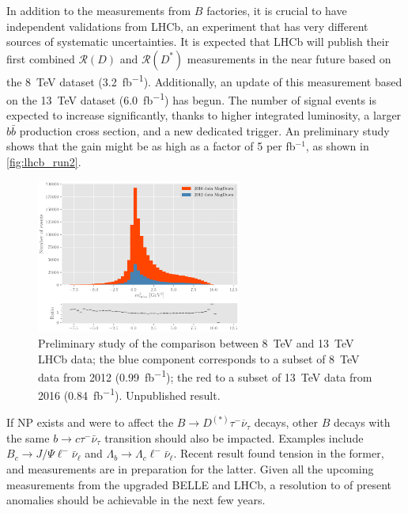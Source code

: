 \documentclass[12pt,letterpaper]{article}
\newcommand{\PRLrule}{
    \bigskip
    \noindent\makebox[\linewidth]{
        \resizebox{0.3333\linewidth}{1pt}{$\blacklozenge$}
    }
    \bigskip
}
\def\RD/{\ensuremath{\mathcal{R}(D)}}
\def\RDst/{\ensuremath{\mathcal{R}(D^{*})}}
\def\DDst/{\ensuremath{D^{(*)}}}
\newcommand{\BMesonMode}[2]{\ensuremath{
    B \rightarrow #2 #1^- \overline{\nu}_#1
}}
\newcommand{\BDDstMode}[1]{\BMesonMode{#1}{\DDst/}}
\begin{document}
In addition to the measurements from $B$ factories, it is crucial to have
independent validations from LHCb, an experiment that has very different sources
of systematic uncertainties.
It is expected that LHCb will publish their first combined \RD/ and \RDst/
measurements in the near future based on the \SI{8}{TeV} dataset
(\SI{3.2}{fb^{-1}}).
Additionally, an update of this measurement based on the \SI{13}{TeV} dataset
(\SI{6.0}{fb^{-1}}) has begun.
The number of signal events is expected to increase significantly, thanks to
higher integrated luminosity, a larger $b \bar{b}$ production cross section, and
a new dedicated trigger.
An preliminary study shows that the gain might be as high as a factor of 5 per
fb$^{-1}$, as shown in \autoref{fig:lhcb_run2}.

\begin{figure}[ht]
    \centering
    \includegraphics[width=0.6\textwidth]{figs/lhcb_run2.pdf}
    \caption{
        Preliminary study of the comparison between \SI{8}{TeV} and \SI{13}{TeV}
        LHCb data;
        the blue component corresponds to a subset of \SI{8}{TeV} data from 2012
        (\SI{0.99}{fb^{-1}});
        the red to a subset of \SI{13}{TeV} data from 2016 (\SI{0.84}{fb^{-1}}).
        Unpublished result.
    }
    \label{fig:lhcb_run2}
\end{figure}

If NP exists and were to affect the \BDDstMode{\tau} decays, other $B$ decays
with the same $b \rightarrow c \tau^- \bar{\nu}_\tau$ transition should also be
impacted.
Examples include $B_c \rightarrow J/\Psi \ell^- \bar{\nu}_\ell$ and
$\Lambda_b \rightarrow \Lambda_c \ell^- \bar{\nu}_\ell$.
Recent result \cite{Aaij:2017tyk} found tension in the former, and measurements
are in preparation for the latter.
Given all the upcoming measurements from the upgraded BELLE and LHCb, a
resolution to of present anomalies should be achievable in the next few years.

\FloatBarrier
\PRLrule
\printbibliography
\end{document}
